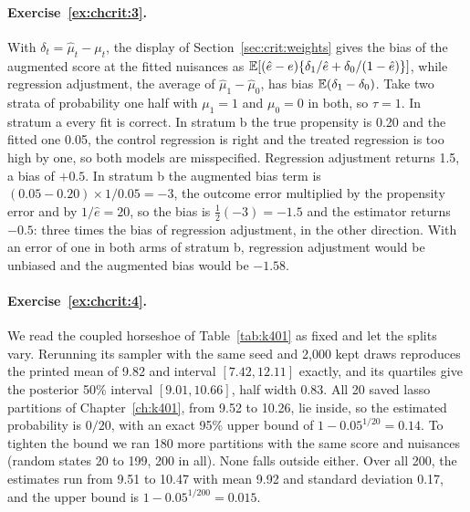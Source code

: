 \paragraph{Exercise~\ref{ex:chcrit:3}.} With $\delta_t = \hat\mu_t - \mu_t$, the display of Section~\ref{sec:crit:weights} gives the bias of the augmented score at the fitted nuisances as $\mathbb{E}[(\hat e - e)\{\delta_1/\hat e + \delta_0/(1 - \hat e)\}]$, while regression adjustment, the average of $\hat\mu_1 - \hat\mu_0$, has bias $\mathbb{E}(\delta_1 - \delta_0)$. Take two strata of probability one half with $\mu_1 = 1$ and $\mu_0 = 0$ in both, so $\tau = 1$. In stratum a every fit is correct. In stratum b the true propensity is 0.20 and the fitted one 0.05, the control regression is right and the treated regression is too high by one, so both models are misspecified. Regression adjustment returns 1.5, a bias of $+0.5$. In stratum b the augmented bias term is $(0.05 - 0.20)\times 1/0.05 = -3$, the outcome error multiplied by the propensity error and by $1/\hat e = 20$, so the bias is $\tfrac12(-3) = -1.5$ and the estimator returns $-0.5$: three times the bias of regression adjustment, in the other direction. With an error of one in both arms of stratum b, regression adjustment would be unbiased and the augmented bias would be $-1.58$.

\paragraph{Exercise~\ref{ex:chcrit:4}.} We read the coupled horseshoe of Table~\ref{tab:k401} as fixed and let the splits vary. Rerunning its sampler with the same seed and 2,000 kept draws reproduces the printed mean of 9.82 and interval $[7.42, 12.11]$ exactly, and its quartiles give the posterior 50\% interval $[9.01, 10.66]$, half width 0.83. All 20 saved lasso partitions of Chapter~\ref{ch:k401}, from 9.52 to 10.26, lie inside, so the estimated probability is $0/20$, with an exact 95\% upper bound of $1 - 0.05^{1/20} = 0.14$. To tighten the bound we ran 180 more partitions with the same score and nuisances (random states 20 to 199, 200 in all). None falls outside either. Over all 200, the estimates run from 9.51 to 10.47 with mean 9.92 and standard deviation 0.17, and the upper bound is $1 - 0.05^{1/200} = 0.015$.



